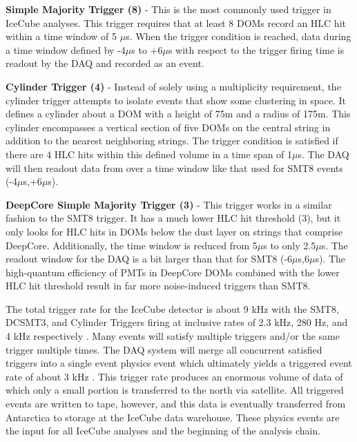 \documentclass{gatech-thesis}
\begin{document}
\begin{adjustwidth}{2.5em}{2.5em}
\setlength{\parindent}{0pt}
\textbf{Simple Majority Trigger (8)} - This is the most commonly used trigger in IceCube analyses. This trigger requires that at least 8 DOMs record an HLC hit within a time window of 5 $\mu$s. When the trigger condition is reached, data during a time window defined by -4$\mu$s to +6$\mu$s with respect to the trigger firing time is readout by the DAQ and recorded as an event.

\textbf{Cylinder Trigger (4)} - Instead of solely using a multiplicity requirement, the cylinder trigger attempts to isolate events that show some clustering in space. It defines a cylinder about a DOM with a height of 75m and a radius of 175m. This cylinder encompasses a vertical section of five DOMs on the central string in addition to the nearest neighboring strings. The trigger condition is satisfied if there are 4 HLC hits within this defined volume in a time span of 1$\mu$s. The DAQ will then readout data from over a time window like that used for SMT8 events (-4$\mu$s,+6$\mu$s).

\textbf{DeepCore Simple Majority Trigger (3)} - This trigger works in a similar fashion to the SMT8 trigger. It has a much lower HLC hit threshold (3), but it only looks for HLC hits in DOMs below the dust layer on strings that comprise DeepCore. Additionally, the time window is reduced from 5$\mu$s to only 2.5$\mu$s. The readout window for the DAQ is a bit larger than that for SMT8 (-6$\mu$s,6$\mu$s). The high-quantum efficiency of PMTs in DeepCore DOMs combined with the lower HLC hit threshold result in far more noise-induced triggers than SMT8.
\end{adjustwidth}
\setlength{\parindent}{17.5pt}

The total trigger rate for the IceCube detector is about 9 kHz with the SMT8, DCSMT3, and Cylinder Triggers firing at inclusive rates of 2.3 kHz, 280 Hz, and 4 kHz respectively \cite{I3Live}. Many events will satisfy multiple triggers and/or the same trigger multiple times. The DAQ system will merge all concurrent satisfied triggers into a single event physics event which ultimately yields a triggered event rate of about 3 kHz \cite{I3Live}. This trigger rate produces an enormous volume of data of which only a small portion is transferred to the north via satellite. All triggered events are written to tape, however, and this data is eventually transferred from Antarctica to storage at the IceCube data warehouse. These physics events are the input for all IceCube analyses and the beginning of the analysis chain.
\end{document}
